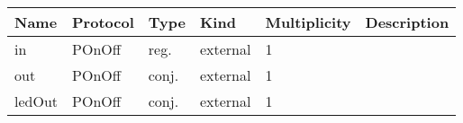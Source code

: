 

\begin{tabular}[ht]{|l|l|l|l|l|p{5cm}|}
\hline
\textbf{Name} & \textbf{Protocol} & \textbf{Type} & \textbf{Kind} & \textbf{Multiplicity} & \textbf{Description}\\
\hline
in & POnOff & reg. & external & 1 & \\
\hline
out & POnOff & conj. & external & 1 & \\
\hline
ledOut & POnOff & conj. & external & 1 & \\
\hline
\end{tabular}


\begin{par}

\end{par}




